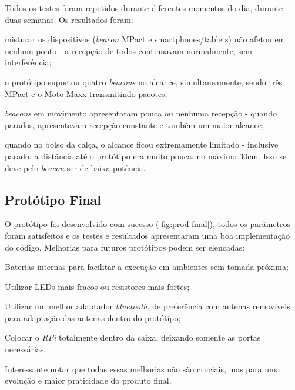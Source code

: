 Todos os testes foram repetidos durante diferentes momentos do dia, durante duas semanas. Os resultados foram:

\begin{alineas}
	\item misturar os dispositivos (\textit{beacon} MPact e smartphones/tablets) não afetou em nenhum ponto - a recepção de todos continuavam normalmente, sem interferência;
	\item o protótipo suportou quatro \textit{beacons} no alcance, simultaneamente, sendo três MPact e o Moto Maxx transmitindo pacotes;
	\item \textit{beacons} em movimento apresentaram pouca ou nenhuma recepção - quando parados, apresentavam recepção constante e também um maior alcance;
	\item quando no bolso da calça, o alcance ficou extremamente limitado - inclusive parado, a distância até o protótipo era muito pouca, no máximo 30cm. Isso se deve pelo \textit{beacon} ser de baixa potência.
\end{alineas}

\subsection{Protótipo Final}\label{sec:prototipo-final}

O protótipo foi desenvolvido com sucesso (\autoref{fig:prod-final}), todos os parâmetros foram satisfeitos e os testes e resultados apresentaram uma boa implementação do código. Melhorias para futuros protótipos podem ser elencadas:

\begin{alineas}
	\item Baterias internas para facilitar a execução em ambientes sem tomada próxima;
	\item Utilizar LEDs mais fracos ou resistores mais fortes;
	\item Utilizar um melhor adaptador \textit{bluetooth}, de preferência com antenas removíveis para adaptação das antenas dentro do protótipo;
	\item Colocar o \textit{RPi} totalmente dentro da caixa, deixando somente as portas necessárias.
\end{alineas}

Interessante notar que todas essas melhorias não são cruciais, mas para uma evolução e maior praticidade do produto final.

